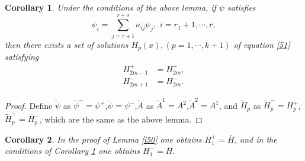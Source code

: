 \documentclass[a4paper,reqno,11pt]{amsart}
\numberwithin{equation}{section} %
\newtheorem*{cor}{Corollary}
\begin{document}
\begin{cor}\label{l51}
	Under the conditions of the above lemma, if $\psi$ satisfies
	\begin{equation}\label{515}
		\psi _i=\sum_{j=r+1}^{r+s}{a_{ij}\psi _j ,\,\,i=r_1+1,\cdots ,r,}
	\end{equation}
	then there exists a set of solutions $H_p (x), (p = 1, \cdots , k+1)$ of equation \eqref{51} satisfying
	\begin{align}
		H^{+}_{2m-1} &= H^{+}_{2m}\label{516} ,\\
		H^{-}_{2m+1} &= H^{-}_{2m}\label{517} .
	\end{align}
\end{cor}
\begin{proof}
	Define $\tilde{\psi} $ as $\tilde{\psi}^{-}=\psi ^{+}$,$\tilde{\psi}^{}=\psi ^{-}$,$\tilde{A}$ as $\tilde{A}^{1}=A ^{2}$,$\tilde{A}^{2}=A ^{1}$, and $\tilde{H}_p$ as $\tilde{H}_p^{-}=H_p ^{+}$,$\tilde{H}_p^{+}=H_p ^{-}$, which are the same as the above lemma. 
\end{proof}

\begin{cor}\label{l52}
	In the proof of Lemma \ref{l50} one obtains $H_1^{+}=\bar{H} $, and in the conditions of Corollary \ref{l51} one obtains $H_1^{-}=\bar{H} $.
\end{cor}






%
%
%



%
%
%
%
%
%
%
%
\end{document}
